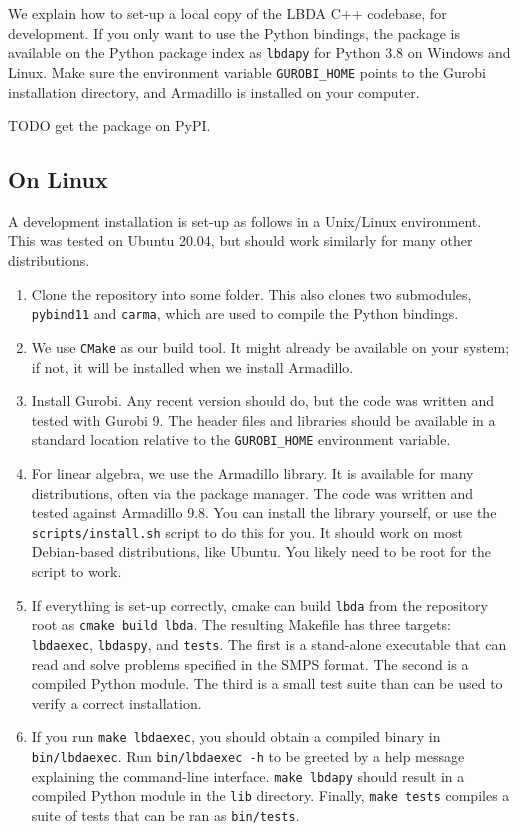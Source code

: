 \documentclass[12pt, english]{article}
\begin{document}
We explain how to set-up a local copy of the LBDA C++ codebase, for development. If you only want to use the Python bindings, the package is available on the Python package index as \texttt{lbdapy} for Python 3.8 on Windows and Linux. Make sure the environment variable \texttt{GUROBI\_HOME} points to the Gurobi installation directory, and Armadillo is installed on your computer. 

TODO get the package on PyPI.  

\subsection{On Linux}
A development installation is set-up as follows in a Unix/Linux environment. This was tested on Ubuntu 20.04, but should work similarly for many other distributions.
\begin{enumerate}
	\item Clone the repository into some folder. This also clones two submodules, \texttt{pybind11} and \texttt{carma}, which are used to compile the Python bindings.
	
	\item We use \texttt{CMake} as our build tool. It might already be available on your system; if not, it will be installed when we install Armadillo.
	
	\item Install Gurobi. Any recent version should do, but the code was written and tested with Gurobi 9. The header files and libraries should be available in a standard location relative to the \texttt{GUROBI\_HOME} environment variable.
	
	\item For linear algebra, we use the Armadillo library. It is available for many distributions, often via the package manager. The code was written and tested against Armadillo 9.8. You can install the library yourself, or use the \texttt{scripts/install.sh} script to do this for you. It should work on most Debian-based distributions, like Ubuntu. You likely need to be root for the script to work.
	
	\item If everything is set-up correctly, cmake can build \texttt{lbda} from the repository root as \texttt{cmake build lbda}. The resulting Makefile has three targets: \texttt{lbdaexec}, \texttt{lbdaspy}, and \texttt{tests}. The first is a stand-alone executable that can read and solve problems specified in the SMPS format. The second is a compiled Python module. The third is a small test suite than can be used to verify a correct installation.
	
	\item If you run \texttt{make lbdaexec}, you should obtain a compiled binary in \texttt{bin/lbdaexec}. Run \texttt{bin/lbdaexec -h} to be greeted by a help message explaining the command-line interface. \texttt{make lbdapy} should result in a compiled Python module in the \texttt{lib} directory. Finally, \texttt{make tests} compiles a suite of tests that can be ran as \texttt{bin/tests}.
\end{enumerate}
\end{document}

